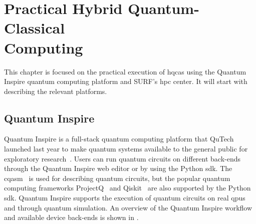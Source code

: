 \chapter[Practical Hybrid Quantum-Classical Computing]{Practical Hybrid Quantum-Classical\\Computing} \label{chap:practical-hybrid-quantum-classical-computing}
This chapter is focused on the practical execution of \glspl{hqca} using the Quantum Inspire quantum computing platform and SURF's \gls{hpc} center.
It will start with describing the relevant platforms.

\section{Quantum Inspire}
Quantum Inspire is a full-stack quantum computing platform that QuTech launched last year to make quantum systems available to the general public for exploratory research~\cite{last2020quantum}.
Users can run quantum circuits on different back-ends through the Quantum Inspire web editor or by using the Python \gls{sdk}.
The \gls{cqasm}~\cite{khammassi2018cqasm} is used for describing quantum circuits, but the popular quantum computing frameworks ProjectQ~\cite{steiger2018projectq} and Qiskit~\cite{qiskit} are also supported by the Python \gls{sdk}.
Quantum Inspire supports the execution of quantum circuits on real \glspl{qpu} and through quantum simulation.
An overview of the Quantum Inspire workflow and available device back-ends is shown in .

